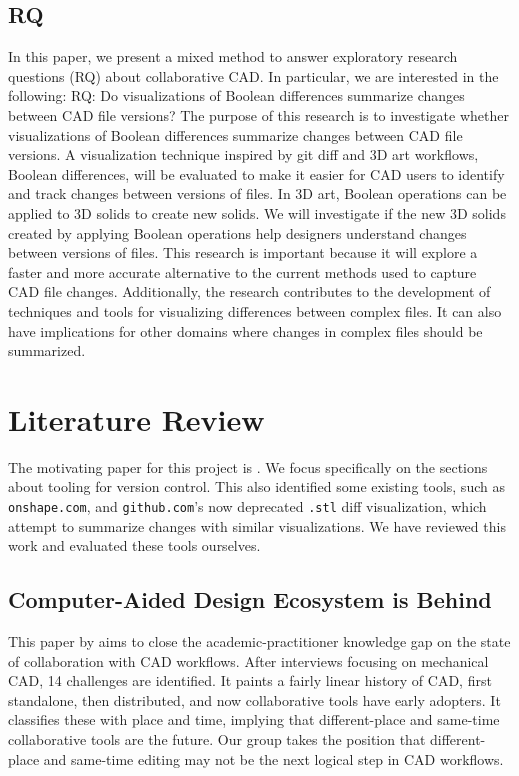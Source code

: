 \documentclass[sigconf,authorversion,nonacm]{acmart}
\begin{document}
\subsection{RQ}
In this paper, we present a mixed method to answer exploratory research questions (RQ) about collaborative CAD. In particular, we are interested in the following:
RQ: Do visualizations of Boolean differences summarize changes between CAD file versions?
The purpose of this research is to investigate whether visualizations of Boolean differences summarize changes between CAD file versions.
A visualization technique inspired by git diff and 3D art workflows, Boolean differences, will be evaluated to make it easier for CAD users to identify and track changes between versions of files.
In 3D art, Boolean operations can be applied to 3D solids to create new solids. We will investigate if the new 3D solids created by applying Boolean operations help designers understand changes between versions of files.
This research is important because it will explore a faster and more accurate alternative to the current methods used to capture CAD file changes. Additionally, the research contributes to the development of techniques and tools for visualizing differences between complex files.
It can also have implications for other domains where changes in complex files should be summarized.

\section{Literature Review}

The motivating paper for this project is \citet{cheng2023age}.
We focus specifically on the sections about tooling for version control.
This also identified some existing tools, such as \texttt{onshape.com}, and \texttt{github.com}'s now deprecated \texttt{.stl} diff visualization, which attempt to summarize changes with similar visualizations.
We have reviewed this work and evaluated these tools ourselves.

\subsection{Computer-Aided Design Ecosystem is Behind}

This paper by \citet{cheng2023age} aims to close the academic-practitioner knowledge gap on the state of collaboration with CAD workflows.
After interviews focusing on mechanical CAD, 14 challenges are identified.
It paints a fairly linear history of CAD, first standalone, then distributed, and now collaborative tools have early adopters.
It classifies these with place and time, implying that different-place and same-time collaborative tools are the future.
Our group takes the position that different-place and same-time editing may not be the next logical step in CAD workflows.
\end{document}
